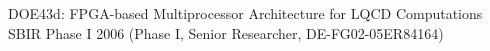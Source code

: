 \begin{itemize}
 	
 	
 	
	DOE43d: FPGA-based Multiprocessor Architecture for LQCD
 	     Computations SBIR Phase I 2006 (Phase I, Senior Researcher,
 	     DE-FG02-05ER84164)
 	
 	
 	
 	
 \end{itemize}
 
